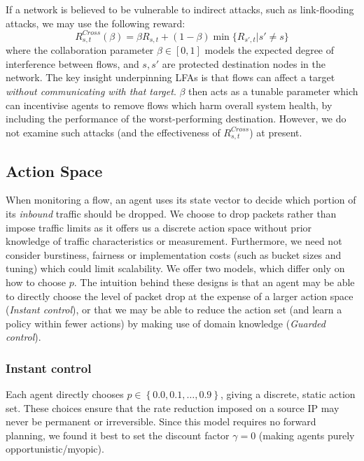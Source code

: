 \documentclass[10pt, times, conference, letterpaper]{IEEEtran}
\begin{document}
If a network is believed to be vulnerable to indirect attacks, such as link-flooding attacks, we may use the following reward:
\begin{equation}
	R_{s,t}^{\mathit{Cross}}(\beta) = \beta R_{s,t} + (1 - \beta) \min{\{R_{s',t} | s' \ne s\}} \label{eqn:lfa-reward}
\end{equation}
where the collaboration parameter $\beta \in [0,1]$ models the expected degree of interference between flows, and $s, s'$ are protected destination nodes in the network.
The key insight underpinning LFAs is that flows can affect a target \emph{without communicating with that target}.
$\beta$ then acts as a tunable parameter which can incentivise agents to remove flows which harm overall system health, by including the performance of the worst-performing destination.
However, we do not examine such attacks (and the effectiveness of $R_{s,t}^{\mathit{Cross}}$) at present.

\subsection{Action Space}
When monitoring a flow, an agent uses its state vector to decide which portion of its \emph{inbound} traffic should be dropped.
We choose to drop packets rather than impose traffic limits as it offers us a discrete action space without prior knowledge of traffic characteristics or measurement.
Furthermore, we need not consider burstiness, fairness or implementation costs (such as bucket sizes and tuning) which could limit scalability.
We offer two models, which differ only on how to choose $p$.
The intuition behind these designs is that an agent may be able to directly choose the level of packet drop at the expense of a larger action space (\emph{Instant control}), or that we may be able to reduce the action set (and learn a policy within fewer actions) by making use of domain knowledge (\emph{Guarded control}).

\subsubsection{Instant control}
Each agent directly chooses $p \in \left\{ 0.0, 0.1, \ldots, 0.9 \right\}$, giving a discrete, static action set.
These choices ensure that the rate reduction imposed on a source IP may never be permanent or irreversible.
Since this model requires no forward planning, we found it best to set the discount factor $\gamma=0$ (making agents purely opportunistic/myopic).
\end{document}
